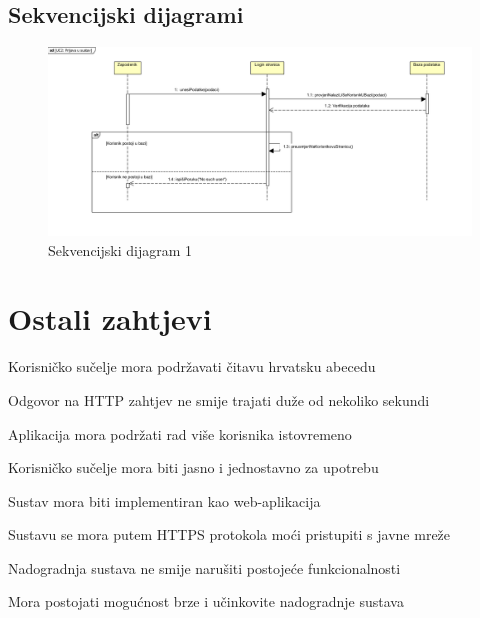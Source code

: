 			\subsection{Sekvencijski dijagrami}
				
				\begin{figure}[H]
					\includegraphics[scale=0.5]{slike/sd1.PNG} %
					\centering
					\caption{Sekvencijski dijagram 1}
					\label{fig:promjene}
				\end{figure}
	
		\section{Ostali zahtjevi}
		
		\begin{packed_item}
			\item Korisničko sučelje mora podržavati čitavu hrvatsku abecedu
			
			\item Odgovor na HTTP zahtjev ne smije trajati duže od nekoliko sekundi
			
			\item Aplikacija mora podržati rad više korisnika istovremeno
			
			\item Korisničko sučelje mora biti jasno i jednostavno za upotrebu
			
			\item Sustav mora biti implementiran kao web-aplikacija
			
			\item Sustavu se mora putem HTTPS protokola moći pristupiti s javne mreže
			
			\item Nadogradnja sustava ne smije narušiti postojeće funkcionalnosti
			
			\item Mora postojati mogućnost brze i učinkovite nadogradnje sustava
			
		\end{packed_item}
		
			
			 
			 
			 
	
